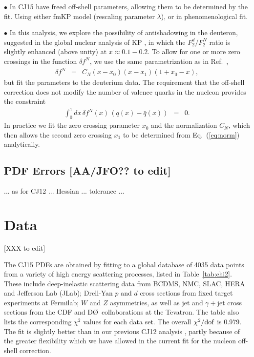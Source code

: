 \documentclass[aps,prd,amsmath,preprint]{revtex4}
\begin{document}
$\bullet$
In CJ15 have freed off-shell parameters, allowing them to be determined
by the fit. Using either fmKP model (rescaling parameter $\lambda$),
or in phenomenological fit.


$\bullet$
In this analysis, we explore the possibility of antishadowing in the
deuteron, suggested in the global nuclear analysis of KP \cite{KP06},
in which the $F_2^d/F_2^N$ ratio is slightly enhanced (above unity)
at $x \approx 0.1-0.2$.
To allow for one or more zero crossings in the function $\delta f^N$,
we use the same parametrization as in Ref.~\cite{KP06},
%
\begin{eqnarray}
\delta f^N
&=& C_N (x-x_0) (x-x_1) (1+x_0-x),
\label{eq:delffit}
\end{eqnarray}
%
but fit the parameters to the deuterium data.
The requirement that the off-shell correction does not modify the
number of valence quarks in the nucleon provides the constraint
%
\begin{eqnarray}
\int_0^1 dx\, \delta f^N(x)\, (q(x)-\bar q(x)) &=& 0.
\label{eq:norm}
\end{eqnarray}
%
In practice we fit the zero crossing parameter $x_0$ and the
normalization $C_N$, which then allows the second zero crossing
$x_1$ to be determined from Eq.~(\ref{eq:norm}) analytically.


\subsection{PDF Errors {\color{red} [AA/JFO?? to edit]}}
\label{ssec:errors}

... as for CJ12 ... Hessian ... tolerance ...



\section{Data} {\color{red} [XXX to edit]}
\label{sec:data}

The CJ15 PDFs are obtained by fitting to a global database of 4035
data points from a variety of high energy scattering processes,
listed in Table~\ref{tab:chi2}.
These include
  deep-inelastic scattering data from BCDMS, NMC, SLAC, HERA and
Jefferson Lab (JLab);
  Drell-Yan $p$ and $d$ cross sections from fixed target experiments
at Fermilab;
  $W$ and $Z$ asymmetries, as well as jet and $\gamma+$jet cross
sections from the CDF and D\O\ collaborations at the Tevatron.
%
The table also lists the corresponding $\chi^2$ values for each
data set.  The overall $\chi^2/{\rm dof}$ is 0.979.
The fit is slightly better than in our previous CJ12 analysis
\cite{CJ12}, partly because of the greater flexibility which
we have allowed in the current fit for the nucleon off-shell
correction.
\end{document}

